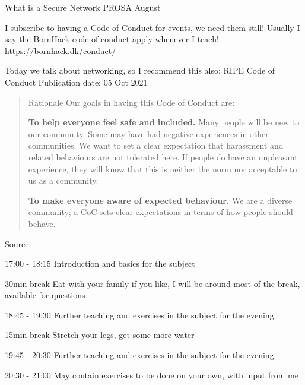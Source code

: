 \documentclass[Screen16to9,17pt]{foils}
\begin{document}
\mytitlepage
{What is a Secure Network}
{PROSA August \the\year{}}


\hlkprofiluk



I subscribe to having a Code of Conduct for events, we need them still! Usually I say the BornHack code of conduct apply whenever I teach! \url{https://bornhack.dk/conduct/}

Today we talk about networking, so I recommend this also:
RIPE Code of Conduct
Publication date: 05 Oct 2021

\begin{quote}
Rationale
Our goals in having this Code of Conduct are:
\begin{list2}
\item {\bf To help everyone feel safe and included.} Many people will be new to our community. Some may have had negative experiences in other communities. We want to set a clear expectation that harassment and related behaviours are not tolerated here. If people do have an unpleasant experience, they will know that this is neither the norm nor acceptable to us as a community.

\item {\bf To make everyone aware of expected behaviour.} We are a diverse community; a CoC sets clear expectations in terms of how people should behave.
\end{list2}
\end{quote}
Source: {\small
{}}


\begin{list2}
\item 17:00 - 18:15
Introduction and basics for the subject

\item 30min break
Eat with your family if you like, I will be around most of the break, available for questions

\item 18:45 - 19:30
Further teaching and exercises in the subject for the evening

\item 15min break
Stretch your legs, get some more water

\item 19:45 - 20:30
Further teaching and exercises in the subject for the evening

\item 20:30 - 21:00 May contain exercises to be done on your own, with input from me
\end{list2}
\end{document}
